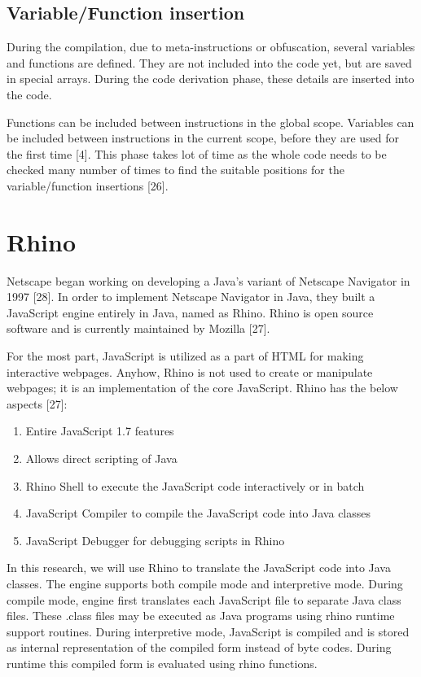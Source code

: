 \subsection{Variable/Function insertion}

During the compilation, due to meta-instructions or obfuscation, several variables and functions are defined. They are not included into the code yet, but are saved in special arrays. During the code derivation phase, these details are inserted into the code.

Functions can be included between instructions in the global scope. Variables can be included between instructions in the current scope, before they are used for the first time [4]. This phase takes lot of time as the whole code needs to be checked many number of times to find the suitable positions for the variable/function insertions [26].


\section{Rhino}

Netscape began working on developing a Java’s variant of Netscape Navigator in 1997 [28]. In order to implement Netscape Navigator in Java, they built a JavaScript engine entirely in Java, named as Rhino. Rhino is open source software and is currently maintained by Mozilla [27].

For the most part, JavaScript is utilized as a part of HTML for making interactive webpages. Anyhow, Rhino is not used to create or manipulate webpages; it is an implementation of the core JavaScript. Rhino has the below aspects [27]:

\begin{enumerate}
\item Entire JavaScript 1.7 features
\item Allows direct scripting of Java
\item Rhino Shell to execute the JavaScript code interactively or in batch
\item JavaScript Compiler to compile the JavaScript code into Java classes
\item JavaScript Debugger for debugging scripts in Rhino
\end{enumerate}
 
In this research, we will use Rhino to translate the JavaScript code into Java classes. The engine supports both compile mode and interpretive mode. During compile mode, engine first translates each JavaScript file to separate Java class files. These .class files may be executed as Java programs using rhino runtime support routines. During interpretive mode, JavaScript is compiled and is stored as internal representation of the compiled form instead of byte codes. During runtime this compiled form is evaluated using rhino functions.

